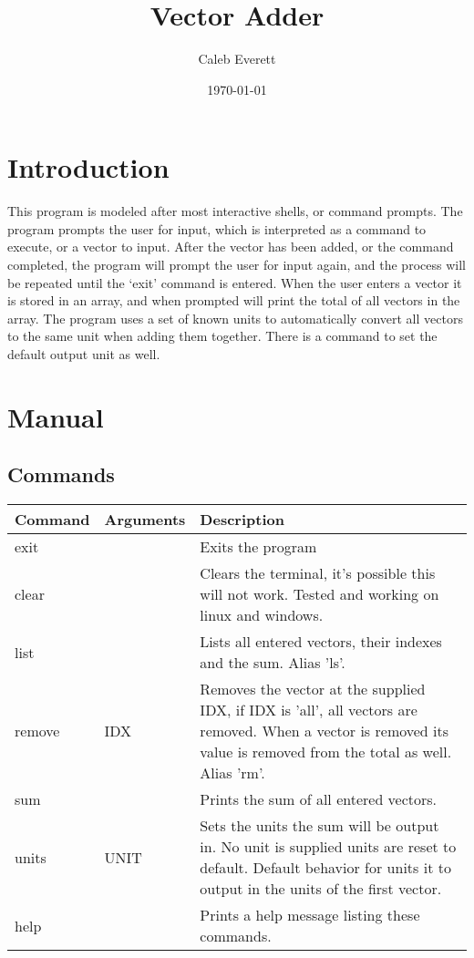\documentclass[a4paper, 12pt] {report}
\author{Caleb Everett}
\date{\today}
\title{Vector Adder}
\begin{document}
\maketitle

\section*{Introduction}{}
This program is modeled after most interactive shells, or command prompts. The
program prompts the user for input, which is interpreted as a command to execute, or
a vector to input.  After the vector has been added, or the command completed, the
program will prompt the user for input again, and the process will be repeated until
the `exit' command is entered.  When the user enters a vector it is stored in an
array, and when prompted will print the total of all vectors in the array. The
program uses a set of known units to automatically convert all vectors to the same
unit when adding them together.  There is a command to set the default output unit as
well.

\section*{Manual}
\subsection*{Commands}
\begin{center}
  \begin{tabular}{| l | l | p{12cm} |}
    \hline
      Command & Arguments & Description \\
    \hline
         exit &           & Exits the program \\ 
    \hline
        clear &           & Clears the terminal, it's possible this will not work.
                            Tested and working on linux and windows. \\
    \hline
         list &           & Lists all entered vectors, their indexes and the sum.
                            Alias 'ls'. \\ 
    \hline
       remove & IDX       & Removes the vector at the supplied IDX, if IDX is 
                             'all', all vectors are removed. When a vector 
                             is removed its value is removed from the total as well.
                             Alias 'rm'. \\
    \hline
          sum &           & Prints the sum of all entered vectors. \\
    \hline
        units & UNIT      & Sets the units the sum will be output in. No unit is 
                             supplied units are reset to default.  Default behavior 
                             for units it to output in the units of the first vector. \\
    \hline
         help &           & Prints a help message listing these commands. \\
    \hline
  \end{tabular}
\end{center}
\end{document}
